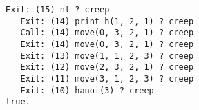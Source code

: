 \documentclass{article}
\begin{document}
\begin{lstlisting}[escapeinside=``]
   Exit: (15) nl ? creep
   Exit: (14) print_h(1, 2, 1) ? creep
   Call: (14) move(0, 3, 2, 1) ? creep
   Exit: (14) move(0, 3, 2, 1) ? creep
   Exit: (13) move(1, 1, 2, 3) ? creep
   Exit: (12) move(2, 3, 2, 1) ? creep
   Exit: (11) move(3, 1, 2, 3) ? creep
   Exit: (10) hanoi(3) ? creep
true.

\end{lstlisting}
\end{document}
